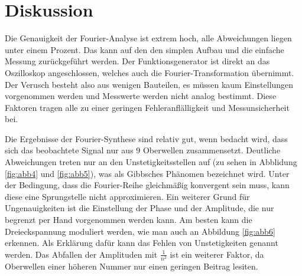\section{Diskussion}
\label{sec:Diskussion}

Die Genauigkeit der Fourier-Analyse ist extrem hoch, alle Abweichungen liegen unter einem Prozent.
Das kann auf den den simplen Aufbau und die einfache Messung zurückgeführt werden.
Der Funktionsgenerator ist direkt an das Oszilloskop angeschlossen, welches auch die Fourier-Transformation übernimmt.
Der Verusch besteht also aus wenigen Bauteilen, es müssen kaum Einstellungen vorgenommen werden und Messwerte werden nicht analog bestimmt.
Diese Faktoren tragen alle zu einer geringen Fehleranflälligkeit und Messunsicherheit bei.

Die Ergebnisse der Fourier-Synthese sind relativ gut, wenn bedacht wird, dass sich das beobachtete Signal nur aus 9 Oberwellen zusammensetzt.
Deutliche Abweichungen treten nur an den Unstetigkeitsstellen auf (zu sehen in Abblidung \ref{fig:abb4} und \ref{fig:abb5}), was als Gibbsches Phänomen bezeichnet wird.
Unter der Bedingung, dass die Fourier-Reihe gleichmäßig konvergent sein muss, kann diese eine Sprungstelle nicht approximieren.
Ein weiterer Grund für Ungenauigkeiten ist die Einstellung der Phase und der Amplitude, die nur begrenzt per Hand vorgenommen werden kann.
Am besten kann die Dreieckspannung moduliert werden, wie man auch an Abbildung \ref{fig:abb6} erkennen.
Als Erklärung dafür kann das Fehlen von Unstetigkeiten genannt werden.
Das Abfallen der Amplituden mit $\frac{1}{n^2}$ ist ein weiterer Faktor, da Oberwellen einer höheren Nummer nur einen geringen Beitrag lesiten.
